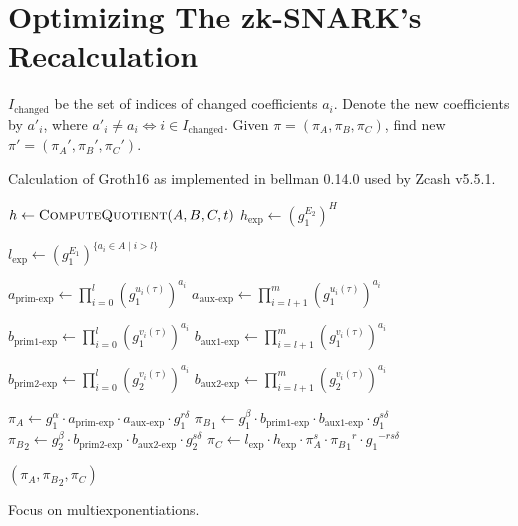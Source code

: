 \documentclass{article}
\begin{document}
\section{Optimizing The zk-SNARK's Recalculation}

$I_\text{changed}$ be the set of indices of changed coefficients $a_i$.
Denote the new coefficients by $a'_i$, where $a'_i \neq a_i \iff i \in I_\text{changed}$.
Given $\pi = (\pi_A, \pi_B, \pi_C)$, find new $\pi' = (\pi_A', \pi_B', \pi_C')$.

\begin{algorithm}
\caption{Calculation of Groth16 as implemented in bellman 0.14.0 used by Zcash v5.5.1.}
\begin{algorithmic}
                \State $h \gets \Call{ComputeQuotient}{A, B, C, t}$
                \State $h_\text{exp} \gets {(g_1^{E_2})}^H$

                \State $l_\text{exp} \gets {(g_1^{E_1})}^{\{a_i \in A \mid i > l\}}$

                \State $a_\text{prim-exp} \gets \prod_{i=0}^l {(g_1^{u_i(\tau)})}^{a_i}$
                \State $a_\text{aux-exp} \gets \prod_{i=l+1}^m {(g_1^{u_i(\tau)})}^{a_i}$

                \State $b_\text{prim1-exp} \gets \prod_{i=0}^l {(g_1^{v_i(\tau)})}^{a_i}$
                \State $b_\text{aux1-exp} \gets \prod_{i=l+1}^m {(g_1^{v_i(\tau)})}^{a_i}$

                \State $b_\text{prim2-exp} \gets \prod_{i=0}^l {(g_2^{v_i(\tau)})}^{a_i}$
                \State $b_\text{aux2-exp} \gets \prod_{i=l+1}^m {(g_2^{v_i(\tau)})}^{a_i}$

                \State $\pi_A \gets g_1^\alpha \cdot a_\text{prim-exp} \cdot a_\text{aux-exp} \cdot g_1^{r\delta}$
                \State ${\pi_B}_1 \gets g_1^\beta \cdot b_\text{prim1-exp} \cdot b_\text{aux1-exp} \cdot g_1^{s\delta}$
                \State ${\pi_B}_2 \gets g_2^\beta \cdot b_\text{prim2-exp} \cdot b_\text{aux2-exp} \cdot g_2^{s\delta}$
                \State $\pi_C \gets l_\text{exp} \cdot h_\text{exp} \cdot \pi_A^s \cdot {{\pi_B}_1}^r \cdot {g_1}^{-rs\delta}$

                \State \Return $(\pi_A, {\pi_B}_2, \pi_C)$
        \EndProcedure
\end{algorithmic}
\end{algorithm}

Focus on multiexponentiations.
\end{document}

